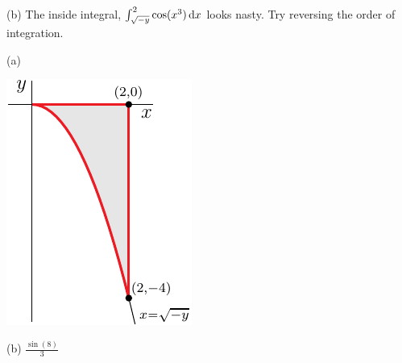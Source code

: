 \begin{hint}
(b) The inside integral, $\int_{\sqrt{-y}}^2 \cos(x^3)\,\mathrm{d}x$
looks nasty. Try reversing the order of integration.
\end{hint}

\begin{answer}
(a) 

\begin{center}
     \includegraphics{fig/OE11D_5.pdf}
\end{center}

(b) $\frac{\sin(8)}{3}$
\end{answer}


